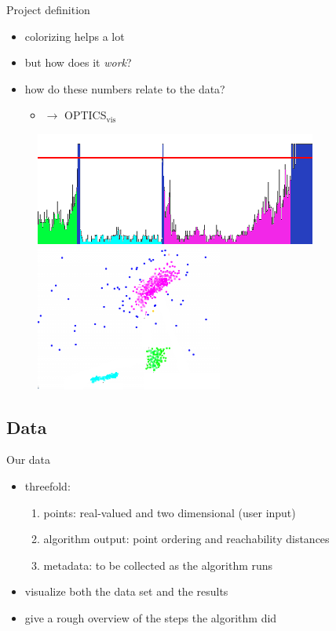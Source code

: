 \documentclass[naustrian]{beamer}
\begin{document}
\begin{frame}{Project definition}
    \begin{itemize}
        \item colorizing helps a lot
        \item but how does it \emph{work}?
        \item how do these numbers relate to the data?
            \begin{itemize}
                \item[] $\rightarrow$ OPTICS$_\text{vis}$
            \end{itemize}
    \end{itemize}
    \begin{figure}[h]
        \centering
        \includegraphics[height=.3\textheight]{img/optics-edited-color}
        \vspace{1em}
        \includegraphics[width=.3\textwidth]{img/optics-edited-points}
    \end{figure}
\end{frame}

\subsection{Data}

\begin{frame}{Our data}
    \begin{itemize}
        \item threefold:
            \begin{enumerate}
                \item points: real-valued and two dimensional (user input)
                \item algorithm output: point ordering and reachability distances
                \item metadata: to be collected as the algorithm runs
            \end{enumerate}
        \item visualize both the data set and the results
        \item give a rough overview of the steps the algorithm did
    \end{itemize}
\end{frame}
\end{document}

